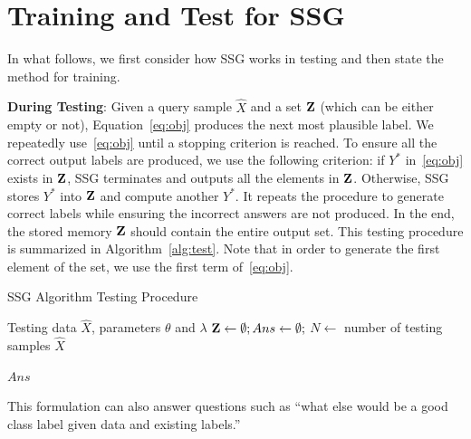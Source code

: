 \documentclass[letterpaper]{article} %
\begin{document}

\section{ Training and Test for SSG}
In what follows, we first consider how SSG works in testing and then state the method for training.

\textbf{During Testing}: Given a query sample $\hat{X}$ and a set ${\bf Z}$ (which can be either empty or not), Equation~\eqref{eq:obj} produces the next most plausible label.  We repeatedly use~\eqref{eq:obj} until a stopping criterion is reached. To ensure all the correct output labels are produced, we use the following criterion: if $Y^*$  in~\eqref{eq:obj} exists in ${\bf Z}$, SSG terminates and outputs all the elements in ${\bf Z}$. Otherwise, SSG stores $Y^*$ into ${\bf Z}$ and compute another $Y^*$. It repeats the procedure to generate correct labels while ensuring the incorrect answers are not produced. In the end, the stored memory ${\bf Z}$ should contain the entire output set. This testing procedure is summarized in Algorithm~\ref{alg:test}. Note that in order to generate the first element of the set, we use the first term of~\eqref{eq:obj}.

\begin{algorithm}[tb]
   \caption{SSG Algorithm Testing Procedure}
   \label{alg:test}
\begin{algorithmic}
    Testing data $\hat{X}$, parameters $\theta$ and $\lambda$
   \STATE ${\bf Z} \leftarrow \emptyset; Ans \leftarrow \emptyset;$
   \STATE $N \leftarrow$ number of testing samples $\hat{X}$

   \ENDWHILE
   \ENDFOR
	  {$Ans$}
\end{algorithmic}
\end{algorithm}



This formulation can also answer questions such as ``what else would be a good class label given data and existing labels.''
\end{document}
